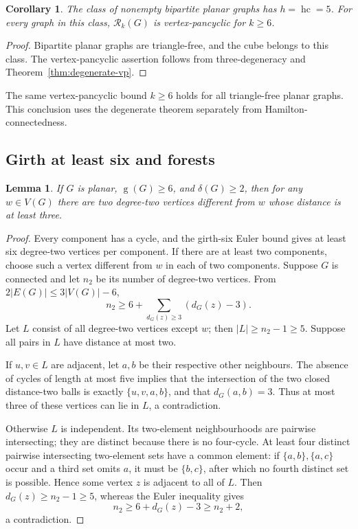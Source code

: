 \documentclass[11pt]{article}
\newtheorem{lemma}[theorem]{Lemma}
\newtheorem{corollary}[theorem]{Corollary}
\theoremstyle{remark}
\newcommand{\Rk}{\mathcal R_k}
\newcommand{\hc}{\operatorname{hc}}
\newcommand{\girth}{\operatorname{g}}
\numberwithin{equation}{section}
\numberwithin{table}{section}
\begin{document}
\begin{corollary}
The class of nonempty bipartite planar graphs has $h=\hc=5$.
For every graph in this class, $\Rk(G)$ is vertex-pancyclic for
$k\ge6$.
\end{corollary}

\begin{proof}
Bipartite planar graphs are triangle-free, and the cube belongs to this
class.  The vertex-pancyclic assertion follows from three-degeneracy and
Theorem~\ref{thm:degenerate-vp}.
\end{proof}

The same vertex-pancyclic bound $k\ge6$ holds for all triangle-free
planar graphs.  This conclusion uses the degenerate theorem separately
from Hamilton-connectedness.

\subsection{Girth at least six and forests}

\begin{lemma}
\label{lem:marked-two}
If $G$ is planar, $\girth(G)\ge6$, and $\delta(G)\ge2$, then for
any $w\in V(G)$ there are two degree-two vertices different from
$w$ whose distance is at least three.
\end{lemma}

\begin{proof}
Every component has a cycle, and the girth-six Euler bound gives at
least six degree-two vertices per component.  If there are at least two
components, choose such a vertex different from $w$ in each of two
components.  Suppose $G$ is connected and let $n_2$ be its number of
degree-two vertices.  From $2|E(G)|\le3|V(G)|-6$,
\[
 n_2\ge6+\sum_{d_G(z)\ge3}(d_G(z)-3).
\]
Let $L$ consist of all degree-two vertices except $w$; then
$|L|\ge n_2-1\ge5$.  Suppose all pairs in $L$ have distance at
most two.

If $u,v\in L$ are adjacent, let $a,b$ be their respective other
neighbours.  The absence of cycles of length at most five implies that
the intersection of the two closed distance-two balls is exactly
$\{u,v,a,b\}$, and that $d_G(a,b)=3$.  Thus at most three of
these vertices can lie in $L$, a contradiction.

Otherwise $L$ is independent.  Its two-element neighbourhoods are
pairwise intersecting; they are distinct because there is no four-cycle.
At least four distinct pairwise intersecting two-element sets have a
common element: if $\{a,b\},\{a,c\}$ occur and a third set omits
$a$, it must be $\{b,c\}$, after which no fourth distinct set is
possible.  Hence some vertex $z$ is adjacent to all of $L$.
Then $d_G(z)\ge n_2-1\ge5$, whereas the Euler inequality gives
\[
 n_2\ge6+d_G(z)-3\ge n_2+2,
\]
a contradiction.
\end{proof}
\end{document}
